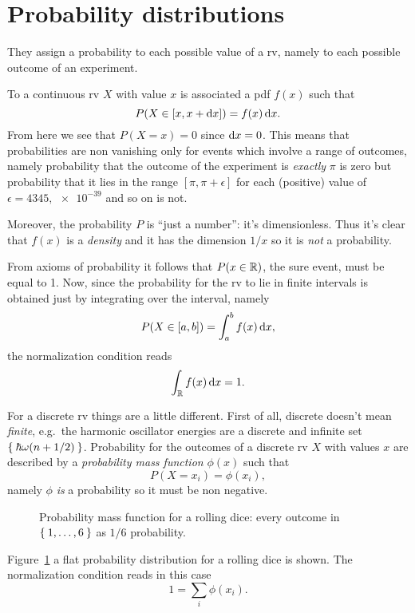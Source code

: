 \section{Probability distributions}

They assign a probability to each possible value of a \ac{rv}, namely to each possible outcome of an experiment.





To a continuous \ac{rv} $X$ with value $x$ is associated a \ac{pdf} $f(x)$ such that
\begin{equation}
	P(X\in[x,x+\mathop{}\!\mathrm{d} x]) = f(x)\mathop{}\!\mathrm{d} x.
\end{equation}
From here we see that $P(X=x) = 0$ since $\mathop{}\!\mathrm{d} x = 0$.
This means that probabilities are non vanishing only for events which involve a range of outcomes, namely probability that the outcome of the experiment is \emph{exactly} $\pi$ is zero but probability that it lies in the range $[\pi,\pi+\epsilon]$ for each (positive) value of $\epsilon = \num{4345}, \num{e-39}$ and so on is not.


Moreover, the probability $P$ is ``just a number'': it's dimensionless.
Thus it's clear that $f(x)$ is a \emph{density} and it has the dimension $1/x$ so it is \emph{not} a probability.


From axioms of probability it follows that $P(x\in\mathbb{R})$, the sure event, must be equal to \num{1}.
Now, since the probability for the \ac{rv} to lie in finite intervals is obtained just by integrating over the interval, namely
\begin{equation}
	P( X \in [a,b] ) = \int_a^b f(x)\mathop{}\!\mathrm{d} x,
\end{equation}
the normalization condition reads
\begin{equation}
	\int_{\mathbb{R}} f(x)\mathop{}\!\mathrm{d} x = 1.
\end{equation}


For a discrete \ac{rv} things are a little different.
First of all, discrete doesn't mean \emph{finite}, e.g.~the harmonic oscillator energies are a discrete and infinite set $\Set{\hbar\omega(n+1/2)}$.
Probability for the outcomes of a discrete \ac{rv} $X$ with values $x$ are described by a \emph{probability mass function} $\phi(x)$ such that
\begin{equation}
	P(X=x_i) = \phi(x_i),
\end{equation}
namely $\phi$ \emph{is} a probability so it must be non negative.
\begin{figure}
	\centering
	
	\caption{Probability mass function for a rolling dice: every outcome in $\Set{1,\dots,6}$ as $1/6$ probability.}
	\label{fig:dicePMD}
\end{figure}
Figure~\ref{fig:dicePMD} a flat probability distribution for a rolling dice is shown.
The normalization condition reads in this case
\begin{equation}
	1 = \sum_i \phi(x_i).
\end{equation}


